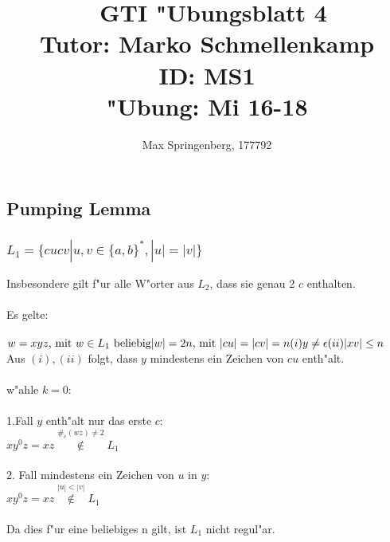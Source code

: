 \documentclass{article}
\author{Max Springenberg, 177792}
\title{\
    GTI "Ubungsblatt 4\\
    Tutor: Marko Schmellenkamp\\
    ID: MS1\\
    "Ubung: Mi 16-18
    }
\date{}
\newcommand{\eps}{\epsilon}
\begin{document}
\maketitle
\newpage

\subsection{Pumping Lemma}

\subsubsection{$L_1 = \{cucv | u,v \in \{a,b\}^*, |u| = |v|\}$}
Insbesondere gilt f"ur alle W"orter aus $L_2$, dass sie genau 2 $c$ enthalten.\\
\\
Es gelte:\\
\\
$w = xyz \text{, mit } w \in L_1 \text{ beliebig}\\
|w| = 2n \text{, mit } |cu| = |cv| = n\\
(i)     y \neq \eps\\
(ii)    |xv| \leq n\\$
\\
Aus $(i), (ii)$ folgt, dass $y$ mindestens ein Zeichen von $cu$ enth"alt.\\
\\
w"ahle $k=0$:\\
\\
1.Fall $y$ enth"alt nur das erste $c$:\\
$xy^0z = xz \overset{\#_c(wz) \neq 2}{\not \in} L_1$\\
\\
2. Fall mindestens ein Zeichen von $u$ in $y$:\\
$xy^0z = xz \overset{|u| < |v|}{\not \in} L_1$\\
\\
Da dies f"ur eine beliebiges n gilt, ist $L_1$ nicht regul"ar.\\

\end{document}

